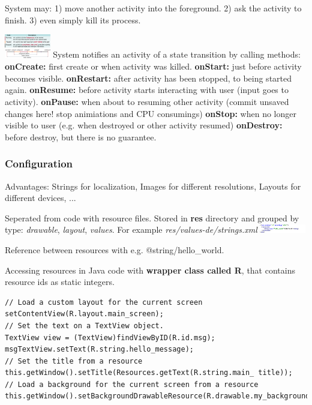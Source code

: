 System may:
1) move another activity into the foreground.
2) ask the activity to finish.
3) even simply kill its process.

\includegraphics[width=0.15\textwidth]{android/activity_states.png}
System notifies an activity of a state transition by calling methods:
\textbf{onCreate:} first create or when activity was killed.
\textbf{onStart:} just before activity becomes visible.
\textbf{onRestart:} after activity has been stopped, to being started again.
\textbf{onResume:} before activity starts interacting with user (input goes to activity).
\textbf{onPause:} when about to resuming other activity (commit unsaved changes
here! stop animiations and CPU consumings)
\textbf{onStop:} when no longer visible to user (e.g. when destroyed or other activity resumed)
\textbf{onDestroy:} before destroy, but there is no guarantee.

\subsubsection{Configuration}
Advantages: Strings for localization, Images for different resolutions, Layouts for
different devices, ...

Seperated from code with resource files. Stored in \textbf{res} directory and
grouped by type: \textit{drawable}, \textit{layout}, \textit{values}. For
example \textit{res/values-de/strings.xml}
\includegraphics[width=0.15\textwidth]{android/example_resource.png}

Reference between resources with e.g. @string/hello_world.

Accessing resources in Java code with \textbf{wrapper class called R}, that
contains resource ids as static integers.

\begin{lstlisting}
// Load a custom layout for the current screen
setContentView(R.layout.main_screen);
// Set the text on a TextView object.
TextView view = (TextView)findViewByID(R.id.msg);
msgTextView.setText(R.string.hello_message);
// Set the title from a resource
this.getWindow().setTitle(Resources.getText(R.string.main_ title));
// Load a background for the current screen from a resource
this.getWindow().setBackgroundDrawableResource(R.drawable.my_background_image);
\end{lstlisting}

